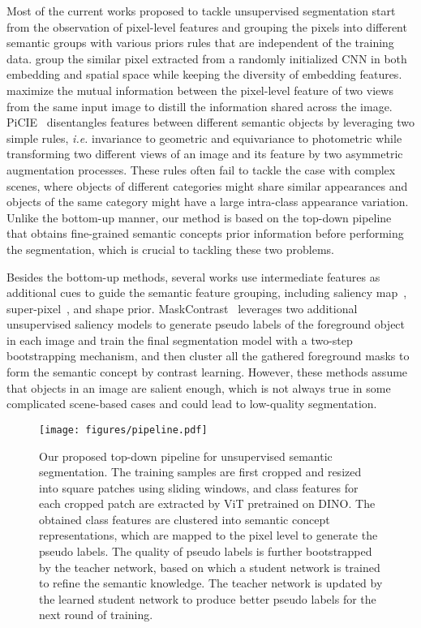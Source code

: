\documentclass[runningheads]{llncs}
\def\ie{\emph{i.e. }}
\begin{document}
Most of the current works proposed to tackle unsupervised segmentation start from the observation of pixel-level features and grouping the pixels into different semantic groups with various priors rules that are independent of the training data. \cite{kanezaki2018unsupervised,kim2020unsupervised} group the similar pixel extracted from a randomly initialized CNN in both embedding and spatial space while keeping the diversity of embedding features. \cite{IIC,InfoSeg,InMARS,ACARL} maximize the mutual information between the pixel-level feature of two views from the same input image to distill the information shared across the image. PiCIE~\cite{PiCIE} disentangles features between different semantic objects by leveraging two simple rules, \ie invariance to geometric and equivariance to photometric while transforming two different views of an image and its feature by two asymmetric augmentation processes. These rules often fail to tackle the case with complex scenes, where objects of different categories might share similar appearances and objects of the same category might have a large intra-class appearance variation. Unlike the bottom-up manner, our method is based on the top-down pipeline that obtains fine-grained semantic concepts prior information before performing the segmentation, which is crucial to tackling these two problems.


Besides the bottom-up methods, several works use intermediate features as additional cues to guide the semantic feature grouping,  including saliency map~\cite{MaskContrast,Labels4Free,ReDO,bielski2019emergence}, super-pixel~\cite{kanezaki2018unsupervised,InMARS}, and shape prior\cite{SegSort,ShapePrior}. MaskContrast~\cite{MaskContrast} leverages two additional unsupervised saliency models to generate pseudo labels of the foreground object in each image and train the final segmentation model with a two-step bootstrapping mechanism, and then cluster all the gathered foreground masks to form the semantic concept by contrast learning. However, these methods assume that objects in an image are salient enough, which is not always true in some complicated scene-based cases and could lead to low-quality segmentation. 


\begin{figure*}[t]
    \centering
    \texttt{[image: figures/pipeline.pdf]}
    \caption{Our proposed top-down pipeline for unsupervised semantic segmentation. The training samples are first cropped and resized into square patches using sliding windows, and class features for each cropped patch are extracted by ViT pretrained on DINO. The obtained class features are clustered into semantic concept representations, which are mapped to the pixel level to generate the pseudo labels. The quality of pseudo labels is further bootstrapped by the teacher network, based on which a student network is trained to refine the semantic knowledge. The teacher network is updated by the learned student network to produce better pseudo labels for the next round of training. \label{fig:pipeline}}
\end{figure*}
\end{document}
